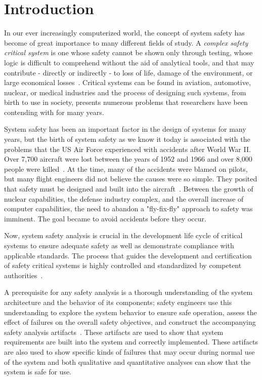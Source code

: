 \chapter{Introduction}
\label{chap:intro}
In our ever increasingly computerized world, the concept of system safety has become of great importance to many different fields of study. A \emph{complex safety critical system} is one whose safety cannot be shown only through testing, whose logic is difficult to comprehend without the aid of analytical tools, and that may contribute - directly or indirectly - to loss of life, damage of the environment, or large economical losses~\cite{SAE}. Critical systems can be found in aviation, automotive, nuclear, or medical industries and the process of designing such systems, from birth to use in society, presents numerous problems that researchers have been contending with for many years. 

System safety has been an important factor in the design of systems for many years, but the birth of system safety as we know it today is associated with the problems that the US Air Force experienced with accidents after World War II. Over 7,700 aircraft were lost between the years of 1952 and 1966 and over 8,000 people were killed~\cite{hammer}. At the time, many of the accidents were blamed on pilots, but many flight engineers did not believe the causes were so simple. They posited that safety must be designed and built into the aircraft~\cite{levesonWhitePaper}. Between the growth of nuclear capabilities, the defense industry complex, and the overall increase of computer capabilities, the need to abandon a "fly-fix-fly" approach to safety was imminent. The goal became to avoid accidents before they occur. 

Now, system safety analysis is crucial in the development life cycle of critical systems to ensure adequate safety as well as demonstrate compliance with applicable standards. The process that guides the development and certification of safety critical systems is highly controlled and standardized by competent authorities~\cite{SAE,SAE:ARP4761,SAE:ARP4754A}.

A prerequisite for any safety analysis is a thorough understanding of the system architecture and the behavior of its components; safety engineers use this understanding to explore the system behavior to ensure safe operation, assess the effect of failures on the overall safety objectives, and construct the accompanying safety analysis artifacts~\cite{SAE:ARP4761,SAE:ARP4754A}. These artifacts are used to show that system requirements are built into the system and correctly implemented. These artifacts are also used to show specific kinds of failures that may occur during normal use of the system and both qualitative and quantitative analyses can show that the system is safe for use.

